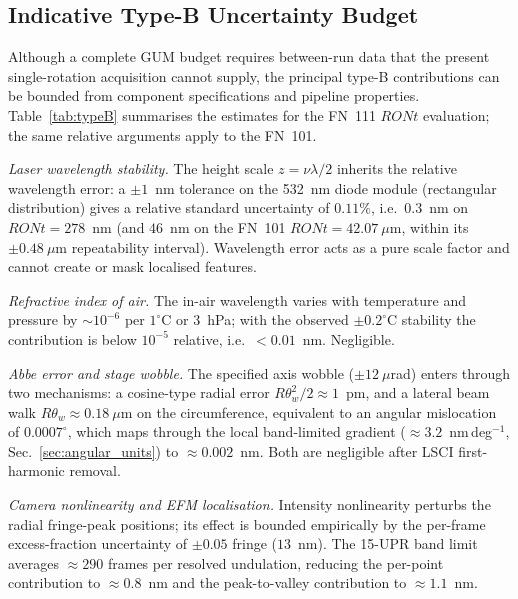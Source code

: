 \documentclass[review]{elsarticle}
\begin{document}
\subsection{Indicative Type-B Uncertainty Budget}
\label{sec:typeB}
Although a complete GUM budget requires between-run data that the present single-rotation acquisition cannot supply, the principal type-B contributions can be bounded from component specifications and pipeline properties. Table~\ref{tab:typeB} summarises the estimates for the FN~111 $RONt$ evaluation; the same relative arguments apply to the FN~101.

\emph{Laser wavelength stability.} The height scale $z=\nu\lambda/2$ inherits the relative wavelength error: a $\pm1$~nm tolerance on the 532~nm diode module (rectangular distribution) gives a relative standard uncertainty of $0.11\%$, i.e.\ $0.3$~nm on $RONt=278$~nm (and $46$~nm on the FN~101 $RONt=42.07~\mu$m, within its $\pm0.48~\mu$m repeatability interval). Wavelength error acts as a pure scale factor and cannot create or mask localised features.

\emph{Refractive index of air.} The in-air wavelength varies with temperature and pressure by $\sim10^{-6}$ per $1^\circ$C or 3~hPa; with the observed $\pm0.2^\circ$C stability the contribution is below $10^{-5}$ relative, i.e.\ $<0.01$~nm. Negligible.

\emph{Abbe error and stage wobble.} The specified axis wobble ($\pm12~\mu$rad) enters through two mechanisms: a cosine-type radial error $R\theta_w^2/2\approx1$~pm, and a lateral beam walk $R\theta_w\approx0.18~\mu$m on the circumference, equivalent to an angular mislocation of $0.0007^\circ$, which maps through the local band-limited gradient ($\approx3.2$~nm\,deg$^{-1}$, Sec.~\ref{sec:angular_units}) to $\approx0.002$~nm. Both are negligible after LSCI first-harmonic removal.

\emph{Camera nonlinearity and EFM localisation.} Intensity nonlinearity perturbs the radial fringe-peak positions; its effect is bounded empirically by the per-frame excess-fraction uncertainty of $\pm0.05$ fringe ($13$~nm). The 15-UPR band limit averages $\approx290$ frames per resolved undulation, reducing the per-point contribution to $\approx0.8$~nm and the peak-to-valley contribution to $\approx1.1$~nm.
\end{document}
